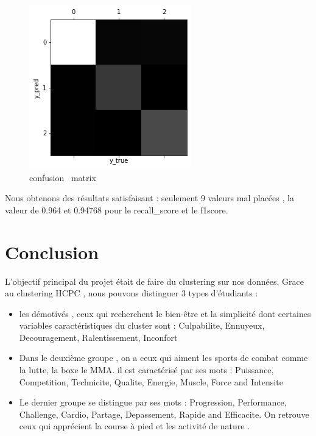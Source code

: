 \documentclass[12pt]{article}
\begin{document}
\begin{figure}[H]
\begin{center}
\includegraphics[scale=0.6]{confusion_matrix_2.png} 
\caption[]{confusion \ matrix}
\end{center}
\end{figure}


Nous obtenons des résultats satisfaisant : 
seulement 9 valeurs mal placées , la valeur de 0.964 et  0.94768 pour le recall\_score et le f1\-score.


\section{Conclusion}
L'objectif principal du projet était de faire du  clustering sur nos données.
Grace au clustering HCPC , nous pouvons distinguer 3 types d'étudiants :

\begin{itemize}

\item les démotivés , ceux qui recherchent le bien-être et la simplicité dont certaines variables caractéristiques du cluster sont :  Culpabilite, Ennuyeux,  Decouragement, Ralentissement, Inconfort 

 \item Dans le deuxième groupe , on a ceux qui aiment les sports de combat comme la lutte, la boxe le MMA. il est caractérisé par ses mots : Puissance, Competition, Technicite, Qualite, Energie, Muscle, Force and Intensite 

 \item Le dernier groupe  se distingue par ses mots : Progression, Performance, 
Challenge, Cardio, Partage, Depassement, Rapide and Efficacite. 
On retrouve ceux qui apprécient la course à pied et les activité de nature . 

\end{itemize}
\end{document}
